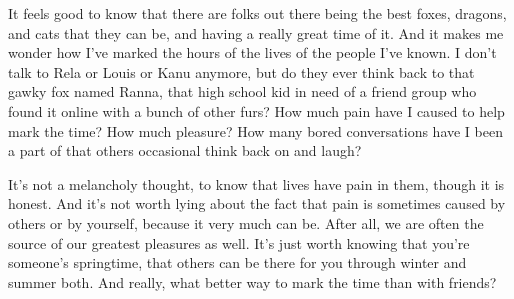 It feels good to know that there are folks out there being the best foxes, dragons, and cats that they can be, and having a really great time of it. And it makes me wonder how I've marked the hours of the lives of the people I've known. I don't talk to Rela or Louis or Kanu anymore, but do they ever think back to that gawky fox named Ranna, that high school kid in need of a friend group who found it online with a bunch of other furs? How much pain have I caused to help mark the time? How much pleasure? How many bored conversations have I been a part of that others occasional think back on and laugh?

It's not a melancholy thought, to know that lives have pain in them, though it is honest. And it's not worth lying about the fact that pain is sometimes caused by others or by yourself, because it very much can be. After all, we are often the source of our greatest pleasures as well. It's just worth knowing that you're someone's springtime, that others can be there for you through winter and summer both. And really, what better way to mark the time than with friends?
